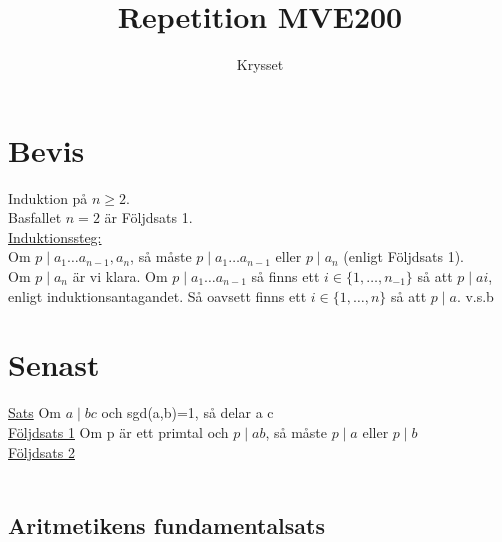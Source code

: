 \documentclass{article}
\title{Repetition MVE200}
\author{Krysset}
\begin{document}
    \section{Bevis}
    Induktion på $n\geq 2$.\\
    Basfallet $n=2$ är Följdsats 1.\\
    \underline{Induktionssteg:}\\
    Om $p\mid a_{1}\ldots a_{n-1}, a_{n}$, så måste $p\mid a_{1} \ldots a_{n-1}$ eller $p\mid a_{n}$ (enligt Följdsats 1).\\
    Om $p\mid a_{n}$ är vi klara. Om $p\mid a_{1}\ldots a_{n-1}$ så finns ett $i\in \{1,\ldots , n_{-1}\}$ så att $p\mid ai$,
    enligt induktionsantagandet. Så oavsett finns ett $i\in \{1,\ldots ,n\}$ så att $p\mid a$. v.s.b
    \section{Senast}
    \underline{Sats} Om $a\mid bc$ och sgd(a,b)=1, så delar a c\\
    \underline{Följdsats 1} Om p är ett primtal och $p\mid ab$, så måste $p\mid a$ eller $p\mid b$\\
    \underline{Följdsats 2} \\
    \\
    \subsection{Aritmetikens fundamentalsats}
\end{document}
